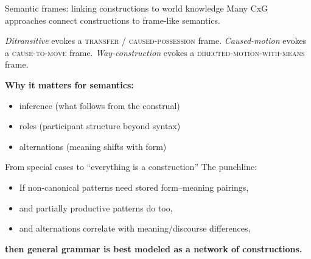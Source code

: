 \begin{frame}{Semantic frames: linking constructions to world knowledge}
\small
Many CxG approaches connect constructions to frame-like semantics.


\begin{exe}
  \ex \emph{Ditransitive} evokes a \textsc{transfer} / \textsc{caused-possession} frame.
  \ex \emph{Caused-motion} evokes a \textsc{cause-to-move} frame.
  \ex \emph{Way-construction} evokes a \textsc{directed-motion-with-means} frame.
\end{exe}


\vspace{0.75em}
\textbf{Why it matters for semantics:}
\begin{itemize}
  \item inference (what follows from the construal)
  \item roles (participant structure beyond syntax)
  \item alternations (meaning shifts with form)
\end{itemize}
\end{frame}

\begin{frame}{From special cases to “everything is a construction”}
\small
The punchline:
\begin{itemize}
  \item If non-canonical patterns need stored form--meaning pairings,
  \item and partially productive patterns do too,
  \item and alternations correlate with meaning/discourse differences,
\end{itemize}
\vspace{0.5em}
\begin{center}
\Large
\textbf{then general grammar is best modeled as a network of constructions.}
\end{center}
\end{frame}

